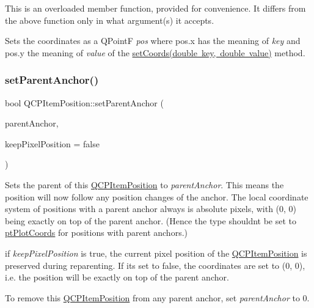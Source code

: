 This is an overloaded member function, provided for convenience. It differs from the above function only in what argument(s) it accepts.

Sets the coordinates as a Q\+PointF {\itshape pos} where pos.\+x has the meaning of {\itshape key} and pos.\+y the meaning of {\itshape value} of the \mbox{\hyperlink{class_q_c_p_item_position_aa988ba4e87ab684c9021017dcaba945f}{set\+Coords(double key, double value)}} method. \mbox{\label{class_q_c_p_item_position_ac094d67a95d2dceafa0d50b9db3a7e51}} 
\subsubsection{\texorpdfstring{set\+Parent\+Anchor()}{setParentAnchor()}}
{\footnotesize\ttfamily bool Q\+C\+P\+Item\+Position\+::set\+Parent\+Anchor (\begin{DoxyParamCaption}\item[{\mbox{\hyperlink{class_q_c_p_item_anchor}{Q\+C\+P\+Item\+Anchor}} $\ast$}]{parent\+Anchor,  }\item[{bool}]{keep\+Pixel\+Position = {\ttfamily false} }\end{DoxyParamCaption})}

Sets the parent of this \mbox{\hyperlink{class_q_c_p_item_position}{Q\+C\+P\+Item\+Position}} to {\itshape parent\+Anchor}. This means the position will now follow any position changes of the anchor. The local coordinate system of positions with a parent anchor always is absolute pixels, with (0, 0) being exactly on top of the parent anchor. (Hence the type shouldn\textquotesingle{}t be set to \mbox{\hyperlink{class_q_c_p_item_position_aad9936c22bf43e3d358552f6e86dbdc8ad5ffb8dc99ad73263f7010c77342294c}{pt\+Plot\+Coords}} for positions with parent anchors.)

if {\itshape keep\+Pixel\+Position} is true, the current pixel position of the \mbox{\hyperlink{class_q_c_p_item_position}{Q\+C\+P\+Item\+Position}} is preserved during reparenting. If it\textquotesingle{}s set to false, the coordinates are set to (0, 0), i.\+e. the position will be exactly on top of the parent anchor.

To remove this \mbox{\hyperlink{class_q_c_p_item_position}{Q\+C\+P\+Item\+Position}} from any parent anchor, set {\itshape parent\+Anchor} to 0.

